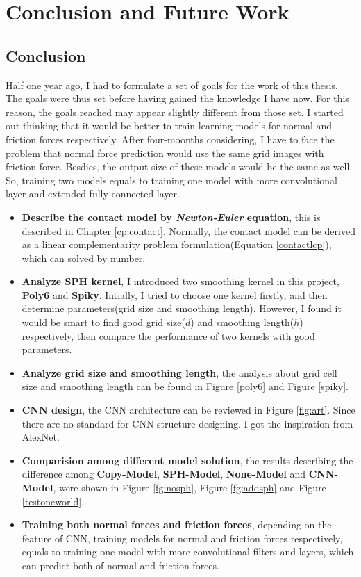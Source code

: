 \chapter{Conclusion and Future Work}

\section{Conclusion}
Half one year ago, I had to formulate a set of goals for the work of this thesis. The goals were thus set before having gained the knowledge I have now. For this reason, the goals reached may appear slightly different from those set. I started out thinking that it would be better to train learning models for normal and friction forces respectively. After four-moonths considering, I have to face the problem that normal force prediction would use the same grid images with friction force. Besdies, the output size of these models would be the same as well. So, training two models equals to training one model with more convolutional layer and extended fully connected layer. 
\begin{itemize}
    \item \textbf{Describe the contact model by \textit{Newton-Euler} equation}, this is described in Chapter \ref{cp:contact}. Normally, the contact model can be derived as a linear complementarity problem formulation(Equation \ref{contactlcp}), which can solved by number.
    \item \textbf{Analyze SPH kernel}, I introduced two smoothing kernel in this project, \textbf{Poly6} and \textbf{Spiky}. Intially, I tried to choose one kernel firstly, and then determine parameters(grid size and smoothing length). However, I found it would be smart to find good grid size($d$) and smoothing length($h$) respectively, then compare the performance of two kernels with good parameters.  
    \item \textbf{Analyze grid size and smoothing length}, the analysis about grid cell size and smoothing length can be found in Figure \ref{poly6} and Figure \ref{spiky}.
    \item \textbf{CNN design}, the CNN architecture can be reviewed in Figure \ref{fig:art}. Since there are no standard for CNN structure designing. I got the inspiration from AlexNet.
    \item \textbf{Comparision among different model solution}, the results describing the difference among \textbf{Copy-Model}, \textbf{SPH-Model}, \textbf{None-Model} and \textbf{CNN-Model}, were shown in Figure \ref{fg:nosph}, Figure \ref{fg:addsph} and Figure \ref{testoneworld}.
    \item \textbf{Training both normal forces and friction forces}, depending on the feature of CNN, training models for normal and friction forces respectively, equals to training one model with more convolutional filters and layers, which can predict both of normal and friction forces.
\end{itemize}

